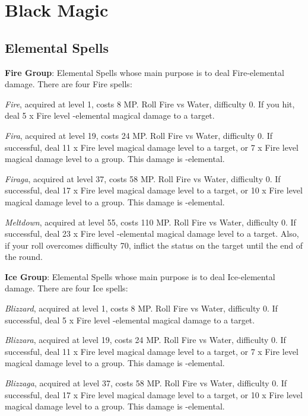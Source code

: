 \setcounter{secnumdepth}{0}
\setcounter{tocdepth}{0}

\section{Black Magic}
\begin{multicols}{2}
    \subsection{Elemental Spells}	
    
    \textbf{Fire Group}: Elemental Spells whose main purpose is to deal Fire-elemental damage. There are four Fire spells:

	\textit{Fire}, acquired at level 1, costs 8 MP. Roll Fire vs Water, difficulty 0. If you hit, deal 5 x Fire level -elemental magical damage to a target.
    
    \textit{Fira}, acquired at level 19, costs 24 MP. Roll Fire vs Water, difficulty 0. If successful, deal 11 x Fire level magical damage level to a target, or 7 x Fire level magical damage level to a group. This damage is -elemental.
    
    \textit{Firaga}, acquired at level 37, costs 58 MP. Roll Fire vs Water, difficulty 0. If successful, deal 17 x Fire level magical damage level to a target, or 10 x Fire level magical damage level to a group. This damage is -elemental.
    
    \textit{Meltdown}, acquired at level 55, costs 110 MP. Roll Fire vs Water, difficulty 0. If successful, deal 23 x Fire level -elemental magical damage level to a target. Also, if your roll overcomes difficulty 70, inflict the  status on the target until the end of the round.
    
    \textbf{Ice Group}: Elemental Spells whose main purpose is to deal Ice-elemental damage. There are four Ice spells:
    
    \textit{Blizzard}, acquired at level 1, costs 8 MP. Roll Fire vs Water, difficulty 0. If successful, deal 5 x Fire level -elemental magical damage to a target.
    
    \textit{Blizzara}, acquired at level 19, costs 24 MP. Roll Fire vs Water, difficulty 0. If successful, deal 11 x Fire level magical damage level to a target, or 7 x Fire level magical damage level to a group. This damage is -elemental.
    
    \textit{Blizzaga}, acquired at level 37, costs 58 MP. Roll Fire vs Water, difficulty 0. If successful, deal 17 x Fire level magical damage level to a target, or 10 x Fire level magical damage level to a group. This damage is -elemental.
    

\end{multicols}
